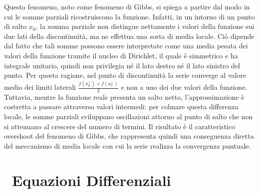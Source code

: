 \documentclass[a4paper,12pt]{report}
\begin{document}
Questo fenomeno, noto come fenomeno di Gibbs, si spiega a partire dal modo in cui le somme parziali ricostruiscono la funzione. Infatti, in un intorno di un punto di salto $x_0$, la somma parziale non distingue nettamente i valori della funzione sui due lati della discontinuità, ma ne effettua una sorta di media locale. Ciò dipende dal fatto che tali somme possono essere interpretate come una media pesata dei valori della funzione tramite il nucleo di Dirichlet, il quale è simmetrico e ha integrale unitario, quindi non privilegia né il lato destro né il lato sinistro del punto. Per questa ragione, nel punto di discontinuità la serie converge al valore medio dei limiti laterali $\frac{f(x_0^+)+f(x_0^-)}{2}$ e non a uno dei due valori della funzione. Tuttavia, mentre la funzione reale presenta un salto netto, l’approssimazione è costretta a passare attraverso valori intermedi: per colmare questa differenza locale, le somme parziali sviluppano oscillazioni attorno al punto di salto che non si attenuano al crescere del numero di termini. Il risultato è il caratteristico overshoot del fenomeno di Gibbs, che rappresenta quindi una conseguenza diretta del meccanismo di media locale con cui la serie realizza la convergenza puntuale.

\newpage

\chapter{\ Equazioni Differenziali}
\end{document}
